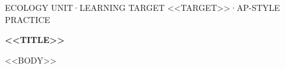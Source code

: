 \documentclass[11pt,letterpaper]{article}
\begin{document}
\thispagestyle{empty}
{\sffamily\small\color{forest} ECOLOGY UNIT\quad·\quad LEARNING TARGET <<TARGET>>\quad·\quad AP-STYLE PRACTICE\par}
\vspace{4pt}
{\raggedright\sffamily\bfseries\huge\color{forest} <<TITLE>>\par}
\vspace{8pt}
<<BODY>>
\end{document}

